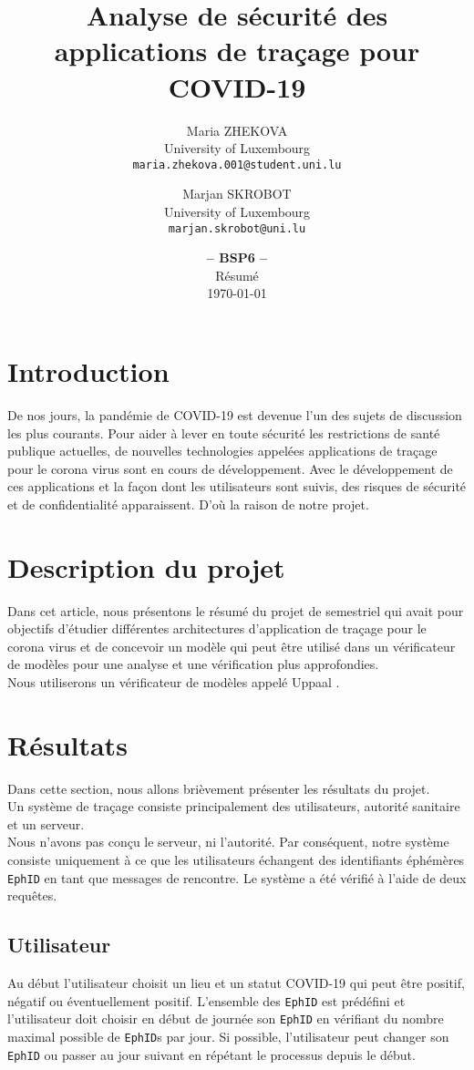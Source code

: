 \documentclass[a4paper, twocolumn]{article}
\title{\textbf{Analyse de sécurité des applications de traçage pour COVID-19}}
\date{\textbf{-- BSP6 --}\\Résumé\\ \today}
\author{
    Maria ZHEKOVA\\
    \small University of Luxembourg\\
    \small\texttt{maria.zhekova.001@student.uni.lu}
	\and
    Marjan SKROBOT\\
    \small University of Luxembourg\\
	\small\texttt{marjan.skrobot@uni.lu}
}
\begin{document}
\maketitle

\section{Introduction}
 De nos jours, la pandémie de COVID-19 est devenue l'un des sujets de discussion les plus courants. Pour aider à lever en toute sécurité les restrictions de santé publique actuelles, de nouvelles technologies appelées applications de traçage pour le corona virus sont en cours de développement. Avec le développement de ces applications et la façon dont les utilisateurs sont suivis, des risques de sécurité et de confidentialité apparaissent. D'où la raison de notre projet.
\section{Description du projet}
Dans cet article, nous présentons le résumé du projet de semestriel qui avait pour objectifs d'étudier différentes architectures d'application de traçage pour le corona virus et de concevoir un modèle qui peut être utilisé dans un vérificateur de modèles pour une analyse et une vérification plus approfondies.\\ 
Nous utiliserons un vérificateur de modèles appelé Uppaal \cite{uppaal}. 

\section{Résultats} 
Dans cette section, nous allons brièvement présenter les résultats du projet.\\
Un système de traçage consiste principalement des utilisateurs, autorité sanitaire et un serveur.\\
Nous n'avons pas conçu le serveur, ni l'autorité. Par conséquent, notre système consiste uniquement à ce que les utilisateurs échangent des identifiants éphémères \texttt{EphID} en tant que messages de rencontre. Le système a été vérifié à l'aide de deux requêtes.
\subsection{Utilisateur}
Au début l'utilisateur choisit un lieu et un statut COVID-19 qui peut être positif, négatif ou éventuellement positif. L'ensemble des \texttt{EphID} est prédéfini et l'utilisateur doit choisir en début de journée son \texttt{EphID} en vérifiant du nombre maximal possible de \texttt{EphID}s par jour. Si possible, l'utilisateur peut changer son \texttt{EphID} ou passer au jour suivant en répétant le processus depuis le début.
\end{document}
